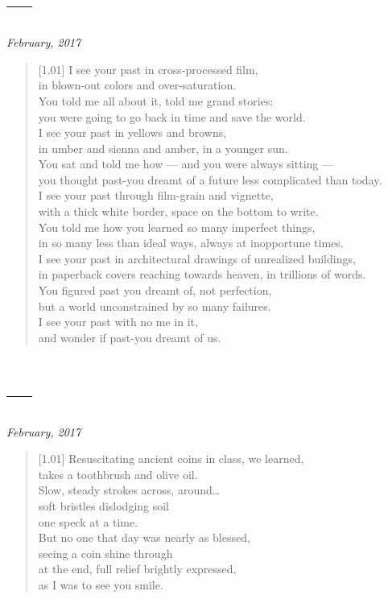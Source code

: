\section*{---}

\hfill\textit{February, 2017}

\begin{verse}[1.01\textwidth]
  I see your past in cross-processed film,\\
  in blown-out colors and over-saturation.\\
  \vin You told me all about it, told me grand stories:\\
  \vin you were going to go back in time and save the world.\\
  I see your past in yellows and browns,\\
  in umber and sienna and amber, in a younger sun.\\
  \vin You sat and told me how --- and you were always sitting ---\\
  \vin you thought past-you dreamt of a future less complicated than today.\\
  I see your past through film-grain and vignette,\\
  with a thick white border, space on the bottom to write.\\
  \vin You told me how you learned so many imperfect things,\\
  \vin in so many less than ideal ways, always at inopportune times.\\
  I see your past in architectural drawings of unrealized buildings,\\
  in paperback covers reaching towards heaven, in trillions of words.\\
  \vin You figured past you dreamt of, not perfection,\\
  \vin but a world unconstrained by so many failures.\\
  I see your past with no me in it,\\
  and wonder if past-you dreamt of us.
\end{verse}
\newpage

\section*{---}

\hfill\textit{February, 2017}

\begin{verse}[1.01\textwidth]
  Resuscitating ancient coins in class, we learned,\\
  takes a toothbrush and olive oil.\\
  Slow, steady strokes across, around\ldots{}\\
  soft bristles dislodging soil\\
  one speck at a time.\\
  But no one that day was nearly as blessed,\\
  seeing a coin shine through\\
  at the end, full relief brightly expressed,\\
  as I was to see you smile.
\end{verse}
\newpage

